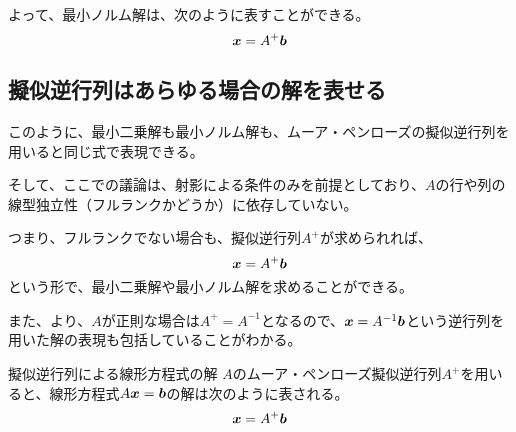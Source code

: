\documentclass[../../../topic_linear-algebra]{subfiles}
\begin{document}
よって、最小ノルム解は、次のように表すことができる。
\begin{equation*}
  \vb*{x} = A^+ \vb*{b}
\end{equation*}

\subsection{擬似逆行列はあらゆる場合の解を表せる}

このように、最小二乗解も最小ノルム解も、ムーア・ペンローズの擬似逆行列を用いると同じ式で表現できる。

そして、ここでの議論は、射影による条件のみを前提としており、$A$の行や列の線型独立性（フルランクかどうか）に依存していない。

\br

つまり、フルランクでない場合も、擬似逆行列$A^+$が求められれば、
\begin{equation*}
  \vb*{x} = A^+ \vb*{b}
\end{equation*}
という形で、最小二乗解や最小ノルム解を求めることができる。

\br

また、より、$A$が正則な場合は$A^+ = A^{-1}$となるので、$\vb*{x} = A^{-1} \vb*{b}$という逆行列を用いた解の表現も包括していることがわかる。

\begin{theorem*}{擬似逆行列による線形方程式の解}
  $A$のムーア・ペンローズ擬似逆行列$A^+$を用いると、線形方程式$A\vb*{x} = \vb*{b}$の解は次のように表される。
  \begin{equation*}
    \vb*{x} = A^+ \vb*{b}
  \end{equation*}
\end{theorem*}
\end{document}
